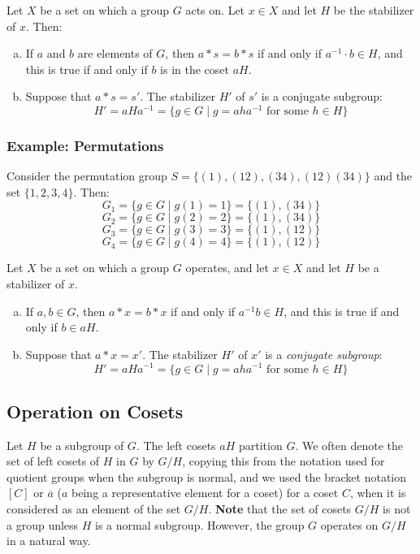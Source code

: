\documentclass[letterpaper]{article}
\begin{document}
\begin{mdframed}
    \begin{proposition}
        Let $X$ be a set on which a group $G$ acts on. Let $x \in X$ and let $H$ be the stabilizer of $x$. Then: 
        \begin{enumerate}[(a)]
            \item If $a$ and $b$ are elements of $G$, then $a * s = b * s$ if and only if $a^{-1} \cdot b \in H$, and this is true if and only if $b$ is in the coset $aH$. 
            \item Suppose that $a * s = s'$. The stabilizer $H'$ of $s'$ is a conjugate subgroup: 
            \[H' = aHa^{-1} = \{g \in G \mid g = aha^{-1} \text{ for some } h \in H\}\]
        \end{enumerate}
    \end{proposition}
\end{mdframed}

\subsubsection{Example: Permutations}
Consider the permutation group $S = \{(1), (12), (34), (12)(34)\}$ and the set $\{1, 2, 3, 4\}$. Then: 
\[G_1 = \{g \in G \mid g(1) = 1\} = \{(1), (34)\}\]
\[G_2 = \{g \in G \mid g(2) = 2\} = \{(1), (34)\}\]
\[G_3 = \{g \in G \mid g(3) = 3\} = \{(1), (12)\}\]
\[G_4 = \{g \in G \mid g(4) = 4\} = \{(1), (12)\}\]

\begin{mdframed}
    \begin{proposition}
        Let $X$ be a set on which a group $G$ operates, and let $x \in X$ and let $H$ be a stabilizer of $x$.
        \begin{enumerate}[(a)]
            \item If $a, b \in G$, then $a * x = b * x$ if and only if $a^{-1}b \in H$, and this is true if and only if $b \in aH$. 
            \item Suppose that $a * x = x'$. The stabilizer $H'$ of $x'$ is a \emph{conjugate subgroup}:
            \[H' = aHa^{-1} = \{g \in G \mid g = aha^{-1} \text{ for some } h \in H\}\]
        \end{enumerate}
    \end{proposition}
\end{mdframed}

\subsection{Operation on Cosets}
Let $H$ be a subgroup of $G$. The left cosets $aH$ partition $G$. We often denote the set of left cosets of $H$ in $G$ by $G / H$, copying this from the notation used for quotient groups when the subgroup is normal, and we used the bracket notation $[C]$ or $\overline{a}$ ($a$ being a representative element for a coset) for a coset $C$, when it is considered as an element of the set $G / H$. \textbf{Note} that the set of cosets $G / H$ is not a group unless $H$ is a normal subgroup. However, the group $G$ operates on $G / H$ in a natural way. 
\end{document}
